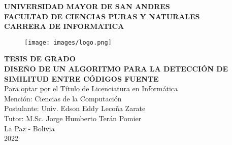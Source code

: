\begin{titlepage}
    \begin{center}
        {\large \textbf{UNIVERSIDAD MAYOR DE SAN ANDRES}}\\
        \vspace{0.25cm}
        {\large \textbf{FACULTAD DE CIENCIAS PURAS Y NATURALES}}\\
        \vspace{0.25cm}
        {\large \textbf{CARRERA DE INFORMATICA}}\\
        \vspace{0.25cm}
        \begin{figure}[h]
            \centering
            \texttt{[image: images/logo.png]}
        \end{figure}
        \vspace{0.25cm}
        {\large \textbf{TESIS DE GRADO}}\\
        \vspace{0.25cm}
        {\large \textbf{DISEÑO DE UN ALGORITMO PARA LA DETECCIÓN DE SIMILITUD ENTRE CÓDIGOS FUENTE}}\\
        \vspace{0.25cm}
        {\large Para optar por el Título de Licenciatura en Informática}\\
        \vspace{0.25cm}
        {\large Mención: Ciencias de la Computación}\\
        \vspace{0.25cm}
        {\large Postulante: Univ. Edson Eddy Lecoña Zarate}\\
        \vspace{0.25cm}
        {\large Tutor: M.Sc. Jorge Humberto Terán Pomier}\\
        \vspace{0.25cm}
        {\large La Paz - Bolivia}\\
        \vspace{0.25cm}
        {\large 2022}\\
    \end{center}
\end{titlepage}
